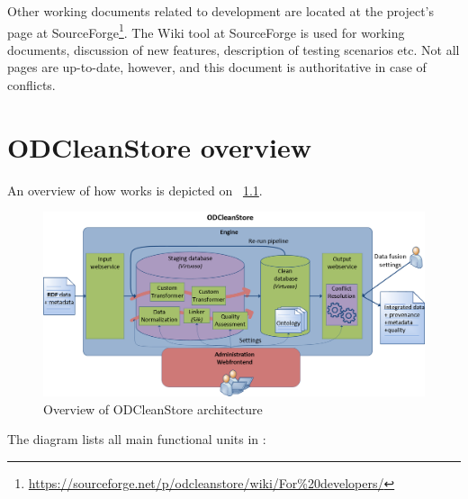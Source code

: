 Other working documents related to development are located at the project's page at SourceForge\footnote{\url{https://sourceforge.net/p/odcleanstore/wiki/For\%20developers/}}. The Wiki tool at SourceForge is used for working documents, discussion of new features, description of testing scenarios etc. Not all pages are up-to-date, however, and this document is authoritative in case of conflicts.



\chapter{ODCleanStore overview} 
An overview of how \odcs works is depicted on \figurename~\ref{fig:odcsInternal}.

\begin{figure}[htb]
    \centering
    \includegraphics[width=\textwidth]{images/odcs-internal.png}
    \caption{Overview of ODCleanStore architecture}
	\label{fig:odcsInternal}
\end{figure}

The diagram lists all main functional units in \odcs:

